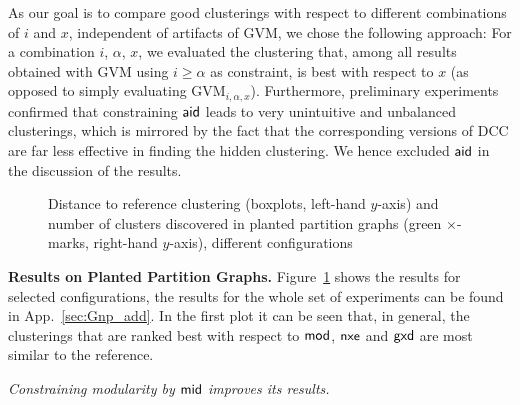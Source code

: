 \documentclass{llncs}
\newcommand{\measure}[1]{\ensuremath{\text{\normalfont{\sffamily {#1}}}}\xspace}
\newcommand{\andreapar}{\vspace*{.5ex}\par\noindent}
\begin{document}
As our goal is to compare good clusterings with respect to different combinations of $i$ and $x$, independent of artifacts of GVM, we chose the following approach:
For a combination $i$, $\alpha$, $x$, we evaluated the clustering that, among all results obtained with GVM using $i \geq \alpha$ as constraint, is best with respect to $x$ (as opposed to simply evaluating $\text{GVM}_{i, \alpha, x}$).
Furthermore, preliminary experiments confirmed that constraining \measure{aid} leads to very unintuitive and unbalanced clusterings, which is mirrored by the fact that the corresponding versions of \textsc{DCC} are far less effective in finding the hidden clustering.
We hence excluded \measure{aid} in the discussion of the results.
\begin{figure}[htbp]
\hfill \vspace{0.1cm}
  \hfill \vspace{0.1cm}
  \hfill \vspace{0.1cm}
  \vspace*{-1ex}
  \caption{Distance to reference clustering (boxplots, left-hand $y$-axis) and number of clusters discovered in planted partition graphs (green $\times$-marks, right-hand $y$-axis), different configurations}\label{fig:Gnp}\end{figure}
\andreapar\textbf{Results on Planted Partition Graphs.}
Figure~\ref{fig:Gnp} shows the results for selected configurations, the results for the whole set of experiments can be found in App.~\ref{sec:Gnp_add}.
In the first plot it can be seen that, in general, the clusterings that are ranked best with respect to \measure{mod}, \measure{nxe} and \measure{gxd} are most similar to the reference. \par\emph{Constraining modularity by \measure{mid} improves its results.}
\end{document}

